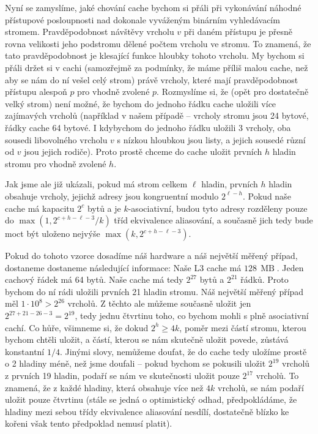 Nyní se zamyslíme, jaké chování cache bychom si přáli při vykonávání náhodné přístupové posloupnosti nad dokonale vyváženým binárním vyhledávacím stromem. Pravděpodobnost návštěvy vrcholu $v$ při daném přístupu je přesně rovna velikosti jeho podstromu dělené počtem vrcholu ve stromu. To znamená, že tato pravděpodobnost je klesající funkce hloubky tohoto vrcholu. My bychom si přáli držet si v cachi (samozřejmě za podmínky, že máme příliš malou cache, než aby se nám do ní vešel celý strom) právě vrcholy, které mají pravděpodobnost přístupu alespoň $p$ pro vhodně zvolené $p$. Rozmyslíme si, že (opět pro dostatečně velký strom) není možné, že bychom do jednoho řádku cache uložili více zajímavých vrcholů (například v našem případě -- vrcholy stromu jsou 24 bytové, řádky cache 64 bytové. I kdybychom do jednoho řádku uložili 3 vrcholy, oba sousedi libovolného vrcholu $v$ s nízkou hloubkou jsou listy, a jejich sousedé různí od $v$ jsou jejich rodiče). Proto prostě chceme do cache uložit prvních $h$ hladin stromu pro vhodně zvolené $h$.

Jak jsme ale již ukázali, pokud má strom celkem $\ell$ hladin, prvních $h$
hladin obsahuje vrcholy, jejichž adresy jsou kongruentní modulo $2^{\ell - h}$.
Pokud naše cache má kapacitu $2^c$ bytů a je $k$-asociativní, budou tyto adresy
rozděleny pouze do $\max\left(1, 2^{c+h-\ell - 3}/k\right)$ tříd
ekvivalence aliasování, a současně jich tedy bude moct být uloženo nejvýše
$\max\left(k, 2^{c+h-\ell - 3}\right).$

Pokud do tohoto vzorce dosadíme náš hardware a náš největší měřený případ,
dostaneme dostaneme následující informace: Naše L3 cache má $128
\,\operatorname{MB}$. Jeden cachový řádek má 64 bytů. Naše cache má tedy
$2^{27}$ bytů a $2^{21}$ řádků. Proto bychom do ní rádi uložili prvních 21 hladin stromu. Náš
největší měřený případ měl $1\cdot 10^8 > 2 ^ {26}$ vrcholů. Z těchto ale
můžeme současně uložit jen $2^{27 + 21 - 26 - 3} = 2^{19}$, tedy jednu čtvrtinu
toho, co bychom mohli s plně asociativní cachí. Co hůře, všimneme si, že dokud
$2^h \geq 4k$, poměr mezi částí stromu, kterou bychom chtěli  uložit, a částí,
kterou se nám skutečně uložit povede, zůstává konstantní $1/4$. Jinými slovy,
nemůžeme doufat, že do cache tedy uložíme prostě o 2 hladiny méně, než jsme
doufali -- pokud bychom se pokusili uložit $2^{19}$ vrcholů z prvních 19
hladin, podaří se nám ve skutečnosti uložit pouze $2^17$ vrcholů. To znamená,
že z každé hladiny, která obsahuje více než $4k$ vrcholů, se nám podaří uložit
pouze čtvrtinu (stále se jedná o optimistický odhad, předpokládáme, že hladiny
mezi sebou třídy ekvivalence aliasování nesdílí, dostatečně blízko ke kořeni
však tento předpoklad nemusí platit). 


